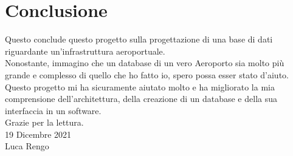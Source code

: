 
\newpage

\section{Conclusione}

\textsf{\small Questo conclude questo progetto sulla progettazione di una base di dati riguardante un'infrastruttura aeroportuale.}\\

\textsf{\small Nonostante, immagino che un database di un vero Aeroporto sia molto più grande e complesso di quello che ho fatto io, spero possa esser stato d'aiuto.}\\

\textsf{\small Questo progetto mi ha sicuramente aiutato molto e ha migliorato la mia comprensione dell'architettura, della creazione di un database e della sua interfaccia in un software.}\\

\textsf{\small Grazie per la lettura.}\\

\flushright
\textsf{\small 19 Dicembre 2021}\\
\flushleft
\textsf{\small Luca Rengo}